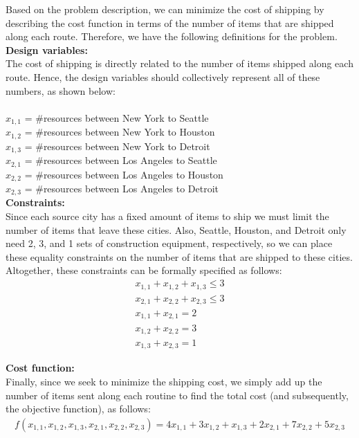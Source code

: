 \documentclass[11pt]{article}
\begin{document}
\begin{prob}{2}
\end{prob}
\begin{sol} 

Based on the problem description, we can minimize the cost of shipping by describing the cost function in terms of the number of items that are shipped along each route. Therefore, we have the following definitions for the problem. \\

\textbf{Design variables:}\\ 
The cost of shipping is directly related to the number of items shipped along each route. Hence, the design variables should collectively represent all of these numbers, as shown below: \\ \\
$x_{1,1}$ = \#resources between New York to Seattle\\
$x_{1,2}$ = \#resources between New York to Houston\\
$x_{1,3}$ = \#resources between New York to Detroit \\
$x_{2,1}$ = \#resources between Los Angeles to Seattle \\
$x_{2,2}$ = \#resources between Los Angeles to Houston \\
$x_{2,3}$ = \#resources between Los Angeles to Detroit \\

\textbf{Constraints:} \\
Since each source city has a fixed amount of items to ship we must limit the number of items that leave these cities. Also, Seattle, Houston, and Detroit only need 2, 3, and 1 sets of construction equipment, respectively, so we can place these equality constraints on the number of items that are shipped to these cities. Altogether, these constraints can be formally specified as follows: 
\begin{eqnarray*}
x_{1,1} + x_{1,2} + x_{1,3} \leq 3 \\
x_{2,1} + x_{2,2} + x_{2,3} \leq 3 \\
x_{1,1} + x_{2,1} = 2 \\
x_{1,2} + x_{2,2} = 3 \\
x_{1,3} + x_{2,3} = 1 
\end{eqnarray*}

\textbf{Cost function:} \\
Finally, since we seek to minimize the shipping cost, we simply add up the number of items sent along each routine to find the total cost (and subsequently, the objective function), as follows:
\begin{eqnarray*}
f(x_{1,1},x_{1,2},x_{1,3},x_{2,1},x_{2,2},x_{2,3}) = 4x_{1,1} + 3x_{1,2} + x_{1,3} + 2x_{2,1} + 7x_{2,2} + 5x_{2,3}
\end{eqnarray*}


\end{sol}
\end{document}
